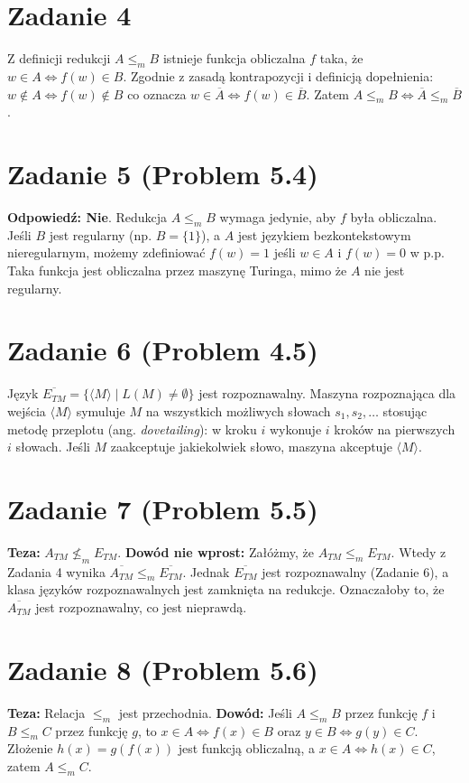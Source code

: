 \documentclass{article}
\begin{document}
\section*{Zadanie 4}
Z definicji redukcji $A \le_m B$ istnieje funkcja obliczalna $f$ taka, że $w \in A \iff f(w) \in B$.
Zgodnie z zasadą kontrapozycji i definicją dopełnienia:
$w \notin A \iff f(w) \notin B$ co oznacza $w \in \overline{A} \iff f(w) \in \overline{B}$.
Zatem $A \le_m B \iff \overline{A} \le_m \overline{B}$.

\section*{Zadanie 5 (Problem 5.4)}
\textbf{Odpowiedź: Nie}.
Redukcja $A \le_m B$ wymaga jedynie, aby $f$ była obliczalna. Jeśli $B$ jest regularny (np. $B=\{1\}$), a $A$ jest językiem bezkontekstowym nieregularnym, możemy zdefiniować $f(w) = 1$ jeśli $w \in A$ i $f(w) = 0$ w p.p. Taka funkcja jest obliczalna przez maszynę Turinga, mimo że $A$ nie jest regularny.

\section*{Zadanie 6 (Problem 4.5)}
Język $\overline{E_{TM}} = \{ \langle M \rangle \mid L(M) \neq \emptyset \}$ jest rozpoznawalny.
Maszyna rozpoznająca dla wejścia $\langle M \rangle$ symuluje $M$ na wszystkich możliwych słowach $s_1, s_2, \dots$ stosując metodę przeplotu (ang. \textit{dovetailing}): w kroku $i$ wykonuje $i$ kroków na pierwszych $i$ słowach. Jeśli $M$ zaakceptuje jakiekolwiek słowo, maszyna akceptuje $\langle M \rangle$.

\section*{Zadanie 7 (Problem 5.5)}
\textbf{Teza:} $A_{TM} \not\le_m E_{TM}$.
\textbf{Dowód nie wprost:} Załóżmy, że $A_{TM} \le_m E_{TM}$. Wtedy z Zadania 4 wynika $\overline{A_{TM}} \le_m \overline{E_{TM}}$.
Jednak $\overline{E_{TM}}$ jest rozpoznawalny (Zadanie 6), a klasa języków rozpoznawalnych jest zamknięta na redukcje. Oznaczałoby to, że $\overline{A_{TM}}$ jest rozpoznawalny, co jest nieprawdą.

\section*{Zadanie 8 (Problem 5.6)}
\textbf{Teza:} Relacja $\le_m$ jest przechodnia.
\textbf{Dowód:} Jeśli $A \le_m B$ przez funkcję $f$ i $B \le_m C$ przez funkcję $g$, to $x \in A \iff f(x) \in B$ oraz $y \in B \iff g(y) \in C$.
Złożenie $h(x) = g(f(x))$ jest funkcją obliczalną, a $x \in A \iff h(x) \in C$, zatem $A \le_m C$.
\end{document}
